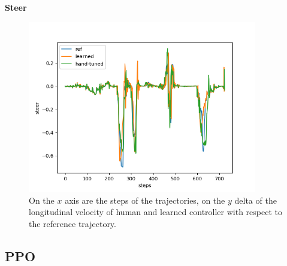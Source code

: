 \textbf{Steer}
\begin{figure}[H]
 \centering
  \captionsetup{width=10cm}
  \includegraphics[width=10cm]{./img/action_pois/steer}
  \caption{On the $x$ axis are the steps of the trajectories, on the $y$ delta of the longitudinal velocity of human and learned controller with respect to the reference trajectory.}
   \label{fig:steer}
\end{figure}





\subsection{PPO}





